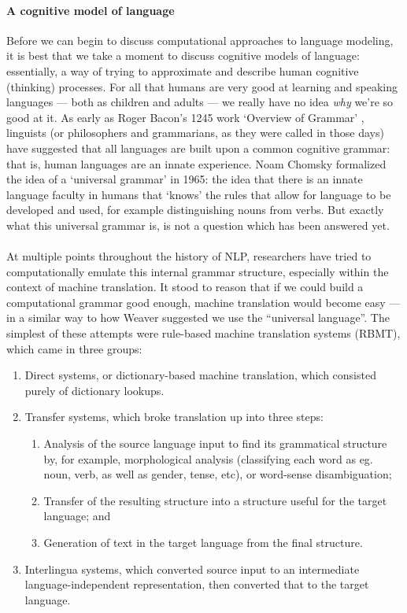 \paragraph{A cognitive model of language}{Before we can begin to
  discuss computational approaches to language modeling, it is best
  that we take a moment to discuss cognitive models of language:
  essentially, a way of trying to approximate and describe human
  cognitive (thinking) processes. For all that humans are very good at
  learning and speaking languages --- both as children and adults ---
  we really have no idea {\it why} we're so good at it. As early as
  Roger Bacon's 1245 work `Overview of Grammar' \cite{bacon},
  linguists (or philosophers and grammarians, as they were called in
  those days) have suggested that all languages are built upon a
  common cognitive grammar: that is, human languages are an innate
  experience. Noam Chomsky formalized the idea of a `universal
  grammar' in 1965: \cite{ug} the idea that there is an innate
  language faculty in humans that `knows' the rules that allow for
  language to be developed and used, for example distinguishing nouns
  from verbs. But exactly what this universal grammar is, is not a
  question which has been answered yet.}
\paragraph{}{At multiple points throughout the history of NLP,
  researchers have tried to computationally emulate this internal
  grammar structure, especially within the context of machine
  translation. It stood to reason that if we could build a
  computational grammar good enough, machine translation would become
  easy --- in a similar way to how Weaver suggested we use the
  ``universal language''. The simplest of these attempts were
  rule-based machine translation systems (RBMT), which came in three
  groups: \cite{jur}}
\begin{enumerate}
\item Direct systems, or dictionary-based machine translation, which
  consisted purely of dictionary lookups.
\item Transfer systems, which broke translation up into three steps:
  \begin{enumerate}
  \item Analysis of the source language input to find its grammatical
    structure by, for example, morphological analysis (classifying
    each word as eg. noun, verb, as well as gender, tense, etc), or
    word-sense disambiguation;
  \item Transfer of the resulting structure into a structure useful
    for the target language; and
  \item Generation of text in the target language from the final
    structure.
  \end{enumerate}
\item Interlingua systems, which converted source input to an
  intermediate language-independent representation, then converted
  that to the target language.
\end{enumerate}

